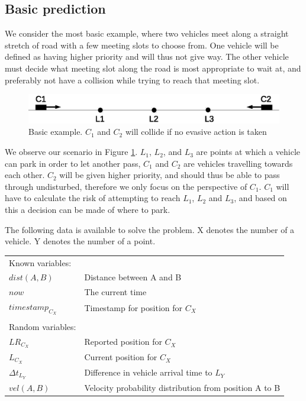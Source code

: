 \documentclass{article}
\begin{document}
		\subsection{Basic prediction}
			We consider the most basic example, where two vehicles meet along a straight stretch of road with a few meeting slots to choose from. One vehicle will be defined as having higher priority and will thus not give way. The other vehicle must decide what meeting slot along the road is most appropriate to wait at, and preferably not have a collision while trying to reach that meeting slot.%

			\begin{figure}[H]
				\includegraphics[scale=0.8]{simpleExampleRisksSimple}
				\caption{Basic example. $C_1$ and $C_2$ will collide if no evasive action is taken}
				\label{fig:simpleExampleRisk}
			\end{figure}

			We observe our scenario in Figure \ref{fig:simpleExampleRisk}. $L_1$, $L_2$, and $L_3$ are points at which a vehicle can park in order to let another pass, $C_1$ and $C_2$ are vehicles travelling towards each other. $C_2$ will be given higher priority, and should thus be able to pass through undisturbed, therefore we only focus on the perspective of $C_1$. $C_1$ will have to calculate the risk of attempting to reach $L_1$, $L_2$ and $L_3$, and based on this a decision can be made of where to park.

			The following data is available to solve the problem. X denotes the number of a vehicle. Y denotes the number of a point.

			\begin{tabular}{l l}
			Known variables: & \\
				$dist(A, B)$ & Distance between A and B \\
				$now$ & The current time \\
				$timestamp_{C_X}$ & Timestamp for position for $C_X$ \\
			& \\
			Random variables: &\\
				$LR_{C_X}$ & Reported position for $C_X$\\
				$L_{C_X}$ & Current position for $C_X$ \\
				$\Delta{t}_{L_Y}$ & Difference in vehicle arrival time to $L_Y$\\
				$vel(A, B)$ & Velocity probability distribution from position A to B\\
			\end{tabular}
\end{document}
